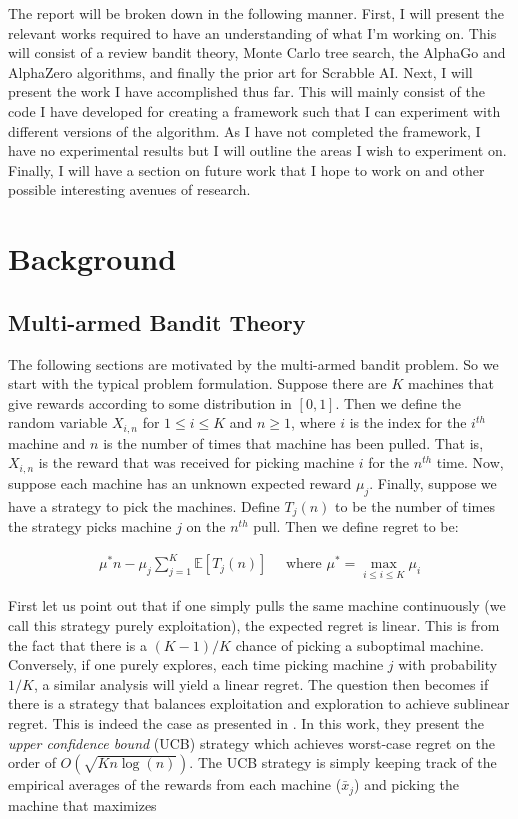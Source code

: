 \documentclass{article}
\begin{document}
  The report will be broken down in the following manner. First, I will present the relevant works required to have an understanding of what I'm working on. This will consist of a review bandit theory, Monte Carlo tree search, the AlphaGo and AlphaZero algorithms, and finally the prior art for Scrabble AI. Next, I will present the work I have accomplished thus far. This will mainly consist of the code I have developed for creating a framework such that I can experiment with different versions of the algorithm. As I have not completed the framework, I have no experimental results but I will outline the areas I wish to experiment on. Finally, I will have a section on future work that I hope to work on and other possible interesting avenues of research.

  \clearpage

  \section{Background}

  \subsection{Multi-armed Bandit Theory}
  The following sections are motivated by the multi-armed bandit problem. So we start with the typical problem formulation. Suppose there are $K$ machines that give rewards according to some distribution in $[0,1]$. Then we define the random variable $X_{i,n}$ for $1 \leq i \leq K$ and $n \geq 1$, where $i$ is the index for the $i^{th}$ machine and $n$ is the number of times that machine has been pulled. That is, $X_{i,n}$ is the reward that was received for picking machine $i$ for the $n^{th}$ time. Now, suppose each machine has an unknown expected reward $\mu_j$. Finally, suppose we have a strategy to pick the machines. Define $T_j(n)$ to be the number of times the strategy picks machine $j$ on the $n^{th}$ pull. Then we define regret to be:

  \begin{gather*}
    \mu^*n - \mu_j \sum_{j=1}^K \mathbb{E} [T_j(n)] \quad \text{ where } \mu^* = \max_{i \leq i \leq K} \mu_i
  \end{gather*}

  First let us point out that if one simply pulls the same machine continuously (we call this strategy purely exploitation), the expected regret is linear. This is from the fact that there is a $(K-1)/K$ chance of picking a suboptimal machine. Conversely, if one purely explores, each time picking machine $j$ with probability $1/K$, a similar analysis will yield a linear regret. The question then becomes if there is a strategy that balances exploitation and exploration to achieve sublinear regret. This is indeed the case as presented in \cite{auer_finite-time_2002}. In this work, they present the \textit{upper confidence bound} (UCB) strategy which achieves worst-case regret on the order of $O(\sqrt{K n \log(n)})$. The UCB strategy is simply keeping track of the empirical averages of the rewards from each machine ($\bar{x}_j$) and picking the machine that maximizes
\end{document}
